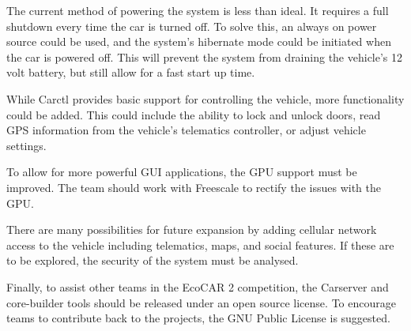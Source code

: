 \documentclass[ece]{uw-wkrpt}
\begin{document}
The current method of powering the system is less than ideal. It requires a full
shutdown every time the car is turned off. To solve this, an always on power
source could be used, and the system's hibernate mode could be initiated when
the car is powered off. This will prevent the system from draining the vehicle's
12 volt battery, but still allow for a fast start up time.

While Carctl provides basic support for controlling the vehicle, more
functionality could be added. This could include the ability to lock and unlock
doors, read GPS information from the vehicle's telematics controller, or adjust
vehicle settings.

To allow for more powerful GUI applications, the GPU support must be improved.
The team should work with Freescale to rectify the issues with the GPU.

There are many possibilities for future expansion by adding cellular network
access to the vehicle including telematics, maps, and social features. If these 
are to be explored, the security of the system must be analysed.

Finally, to assist other teams in the EcoCAR 2 competition, the Carserver and
core-builder tools should be released under an open source license. To encourage
teams to contribute back to the projects, the GNU Public License is suggested.

\backmatter

%

\end{document}
